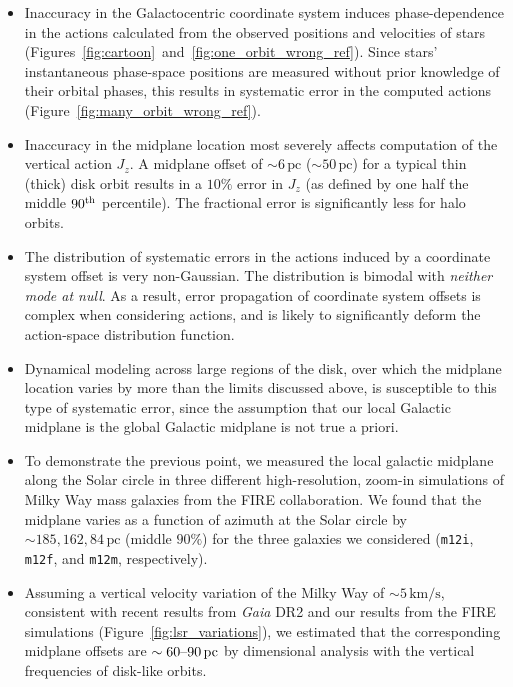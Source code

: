 \documentclass[twocolumn]{aastex62}
\newcommand{\pc}{\text{pc}}
\newcommand{\kms}{\text{km}/\text{s}}
\newcommand{\mi}{\texttt{m12i}}
\newcommand{\mf}{\texttt{m12f}}
\newcommand{\mm}{\texttt{m12m}}
\newcommand{\uth}{\textsuperscript{th}}
\begin{document}
\begin{itemize}
\item Inaccuracy in the Galactocentric coordinate
system induces phase-dependence in the actions calculated from the observed
positions and velocities of stars
(Figures~\ref{fig:cartoon}~and~\ref{fig:one_orbit_wrong_ref}). Since stars'
instantaneous phase-space positions are measured without prior knowledge of
their orbital phases, this results in systematic error in the computed actions
(Figure~\ref{fig:many_orbit_wrong_ref}).

\item Inaccuracy in the midplane location most severely affects computation of
the vertical action $J_z$.  A midplane offset of $\sim6\,\pc$ ($\sim50\,\pc$)
for a typical thin (thick) disk orbit results in a  $10\%$ error in $J_z$ (as
defined by one half the middle $90\uth$ percentile). The fractional error is
significantly less for halo orbits.

\item The distribution of systematic errors in the actions induced by a
coordinate system offset is very non-Gaussian. The distribution is bimodal
with \emph{neither mode at null}. As a result, error propagation of coordinate
system offsets is complex when considering actions, and is likely to
significantly deform the action-space distribution function.

\item Dynamical modeling across large regions of the disk, over which the
midplane location varies by more than the limits discussed above, is
susceptible to this type of systematic error, since the assumption that our
local Galactic midplane is the global Galactic midplane is not true a
priori.

\item To demonstrate the previous point, we measured the local galactic
midplane along the Solar circle in three different high-resolution, zoom-in
simulations of Milky Way mass galaxies from the FIRE collaboration. We found
that the midplane varies as a function of azimuth at the Solar circle by
$\sim185, 162, 84\,\pc$ (middle $90\%$) for the three galaxies we considered
(\mi{}, \mf{}, and \mm{}, respectively).

\item Assuming a vertical velocity variation of the Milky Way of
$\sim5\,\kms$, consistent with recent results from \textit{Gaia} DR2
\citep{2018A&A...616A..11G, 2019arXiv190209569F} and our results from the FIRE
simulations (Figure~\ref{fig:lsr_variations}), we estimated that the
corresponding midplane offsets are $\sim60\textup{--}90\,\pc$ by dimensional
analysis with the vertical frequencies of disk-like orbits.


\end{itemize}
\end{document}
